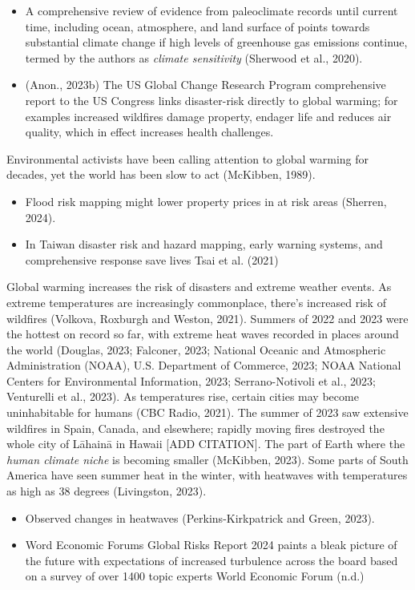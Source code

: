 \documentclass[
  letterpaper,
  DIV=11,
  numbers=noendperiod]{scrartcl}
\providecommand{\tightlist}{%
  \setlength{\itemsep}{0pt}\setlength{\parskip}{0pt}}\usepackage{longtable,booktabs,array}
\begin{document}
\begin{itemize}
\item
  A comprehensive review of evidence from paleoclimate records until
  current time, including ocean, atmosphere, and land surface of points
  towards substantial climate change if high levels of greenhouse gas
  emissions continue, termed by the authors as \emph{climate
  sensitivity} (Sherwood et al., 2020).
\item
  (Anon., 2023b) The US Global Change Research Program comprehensive
  report to the US Congress links disaster-risk directly to global
  warming; for examples increased wildfires damage property, endager
  life and reduces air quality, which in effect increases health
  challenges.
\end{itemize}

Environmental activists have been calling attention to global warming
for decades, yet the world has been slow to act (McKibben, 1989).

\begin{itemize}
\item
  Flood risk mapping might lower property prices in at risk areas
  (Sherren, 2024).
\item
  In Taiwan disaster risk and hazard mapping, early warning systems, and
  comprehensive response save lives Tsai et al. (2021)
\end{itemize}

Global warming increases the risk of disasters and extreme weather
events. As extreme temperatures are increasingly commonplace, there's
increased risk of wildfires (Volkova, Roxburgh and Weston, 2021).
Summers of 2022 and 2023 were the hottest on record so far, with extreme
heat waves recorded in places around the world (Douglas, 2023; Falconer,
2023; National Oceanic and Atmospheric Administration (NOAA), U.S.
Department of Commerce, 2023; NOAA National Centers for Environmental
Information, 2023; Serrano-Notivoli et al., 2023; Venturelli et al.,
2023). As temperatures rise, certain cities may become uninhabitable for
humans (CBC Radio, 2021). The summer of 2023 saw extensive wildfires in
Spain, Canada, and elsewhere; rapidly moving fires destroyed the whole
city of Lāhainā in Hawaii {[}ADD CITATION{]}. The part of Earth where
the \emph{human climate niche} is becoming smaller (McKibben, 2023).
Some parts of South America have seen summer heat in the winter, with
heatwaves with temperatures as high as 38 degrees (Livingston, 2023).

\begin{itemize}
\tightlist
\item
  Observed changes in heatwaves (Perkins-Kirkpatrick and Green, 2023).
\item
  Word Economic Forums Global Risks Report 2024 paints a bleak picture
  of the future with expectations of increased turbulence across the
  board based on a survey of over 1400 topic experts World Economic
  Forum (n.d.)
\end{itemize}
\end{document}
